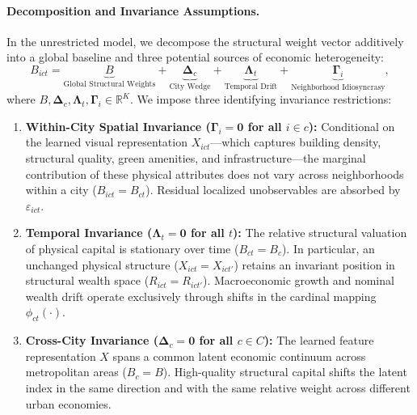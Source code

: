 \paragraph{Decomposition and Invariance Assumptions.}
In the unrestricted model, we decompose the structural weight vector additively into a global baseline and three potential sources of economic heterogeneity:
\begin{equation}
B_{ict} = \underbrace{B}_{\text{Global Structural Weights}} + \underbrace{\mathbf{\Delta}_c}_{\text{City Wedge}} + \underbrace{\mathbf{\Lambda}_t}_{\text{Temporal Drift}} + \underbrace{\mathbf{\Gamma}_i}_{\text{Neighborhood Idiosyncrasy}},
\label{eq:b_additive_decomp}
\end{equation}
where $B, \mathbf{\Delta}_c, \mathbf{\Lambda}_t, \mathbf{\Gamma}_i \in \mathbb{R}^K$. We impose three identifying invariance restrictions:

\begin{enumerate}
    \item[\textbf{A1.}] \textbf{Within-City Spatial Invariance ($\mathbf{\Gamma}_i = \mathbf{0}$ for all $i \in c$):} 
    Conditional on the learned visual representation $X_{ict}$—which captures building density, structural quality, green amenities, and infrastructure—the marginal contribution of these physical attributes does not vary across neighborhoods within a city ($B_{ict} = B_{ct}$). Residual localized unobservables are absorbed by $\varepsilon_{ict}$.
    
    \item[\textbf{A2.}] \textbf{Temporal Invariance ($\mathbf{\Lambda}_t = \mathbf{0}$ for all $t$):} 
    The relative structural valuation of physical capital is stationary over time ($B_{ct} = B_c$). In particular, an unchanged physical structure ($X_{ict} = X_{ict'}$) retains an invariant position in structural wealth space ($R_{ict} = R_{ict'}$). Macroeconomic growth and nominal wealth drift operate exclusively through shifts in the cardinal mapping $\phi_{ct}(\cdot)$.
    
    \item[\textbf{A3.}] \textbf{Cross-City Invariance ($\mathbf{\Delta}_c = \mathbf{0}$ for all $c \in C$):} 
    The learned feature representation $X$ spans a common latent economic continuum across metropolitan areas ($B_c = B$). High-quality structural capital shifts the latent index in the same direction and with the same relative weight across different urban economies.
\end{enumerate}

